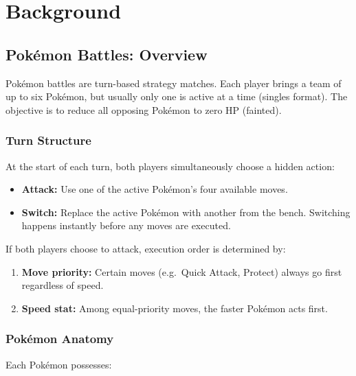 \chapter{Background}
\label{ch:background}

\section{Pok\'{e}mon Battles: Overview}

Pok\'{e}mon battles are turn-based strategy matches.  Each player brings a team
of up to six Pok\'{e}mon, but usually only one is active at a time (singles
format).  The objective is to reduce all opposing Pok\'{e}mon to zero HP
(fainted).

\subsection{Turn Structure}

At the start of each turn, both players simultaneously choose a hidden action:

\begin{itemize}
  \item \textbf{Attack:} Use one of the active Pok\'{e}mon's four available
        moves.
  \item \textbf{Switch:} Replace the active Pok\'{e}mon with another from the
        bench.  Switching happens instantly before any moves are executed.
\end{itemize}

If both players choose to attack, execution order is determined by:

\begin{enumerate}
  \item \textbf{Move priority:} Certain moves (e.g.\ Quick Attack, Protect)
        always go first regardless of speed.
  \item \textbf{Speed stat:} Among equal-priority moves, the faster
        Pok\'{e}mon acts first.
\end{enumerate}

\subsection{Pok\'{e}mon Anatomy}

Each Pok\'{e}mon possesses:

